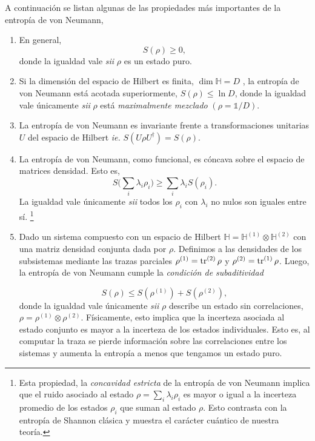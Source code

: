 \documentclass{report} %
\newcommand{\sii}{\textit{sii }}
\newcommand{\ie}{\textit{ie. }}
\numberwithin{equation}{section}
\begin{document}
 A continuación se listan algunas de las propiedades más importantes de la entropía de von Neumann,
 
 \begin{enumerate}
     \item En general,
     $$
     S(\rho) \geq 0,
     $$
     donde la igualdad vale \sii $\rho$ es un estado puro.
     \item 
     Si la dimensión del espacio de Hilbert es finita, $\dim \mathbb{H} = D$ , la entropía de von Neumann está acotada superiormente, $S(\rho) \leq \ln D$, donde la igualdad vale únicamente \sii $\rho$ está \textit{maximalmente mezclado} $(\rho = \mathds{1}/D)$.
     \item La entropía de von Neumann es invariante frente a  transformaciones unitarias $U$ del espacio de Hilbert \ie $S(U\rho U^{\dagger}) = S(\rho)$.
     \item La entropía de von Neumann, como funcional, es cóncava sobre el espacio de matrices densidad. Esto es,
     $$
     S \bigg(\sum_{i} \lambda_i \rho_i\bigg) \geq \sum_{i} \lambda_i S(\rho_i).
     $$
     La igualdad vale únicamente \sii todos los $\rho_i$ con $\lambda_i$ no nulos son iguales entre sí. \footnote{Esta propiedad, la \textit{concavidad estricta} de la entropía de von Neumann implica que el ruido asociado al estado $\rho = \sum_i \lambda_i \rho_i$ es mayor o igual a la incerteza promedio de los estados $\rho_i$ que suman al estado $\rho$. Esto contrasta con la entropía de Shannon clásica y muestra el carácter cuántico de nuestra teoría.}
     \item Dado un sistema compuesto con un espacio de Hilbert $\mathbb{H} = \mathbb{H}^{(1)} \otimes \mathbb{H}^{(2)}$ con una matriz densidad conjunta dada por $\rho$. Definimos a las densidades de los subsistemas mediante las trazas parciales $\rho^{(1)}=\tr^{(2)} \rho$ y $\rho^{(2)}=\tr^{(1)} \rho$. Luego, la entropía de von Neumann cumple la \textit{condición de subaditividad}
     
     $$
     S(\rho) \leq S(\rho^{(1)}) + S(\rho^{(2)}),
     $$
     donde la igualdad vale únicamente \sii $\rho$ describe un estado sin correlaciones, $\rho = \rho^{(1)} \otimes \rho^{(2)}$. Físicamente, esto implica que la incerteza asociada al estado conjunto es mayor a la incerteza de los estados individuales. Esto es, al computar la traza se pierde información sobre las correlaciones entre los sistemas y aumenta la entropía a menos que tengamos un estado puro. 
     \end{enumerate}
   
\end{document}
